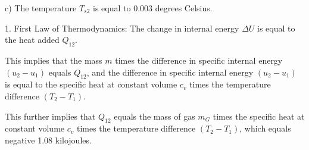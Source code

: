 c) The temperature \( T_{s2} \) is equal to 0.003 degrees Celsius.

1. First Law of Thermodynamics:
The change in internal energy \( \Delta U \) is equal to the heat added \( Q_{12} \).

This implies that the mass \( m \) times the difference in specific internal energy \( (u_2 - u_1) \) equals \( Q_{12} \), and the difference in specific internal energy \( (u_2 - u_1) \) is equal to the specific heat at constant volume \( c_v \) times the temperature difference \( (T_2 - T_1) \).

This further implies that \( Q_{12} \) equals the mass of gas \( m_G \) times the specific heat at constant volume \( c_v \) times the temperature difference \( (T_2 - T_1) \), which equals negative 1.08 kilojoules.